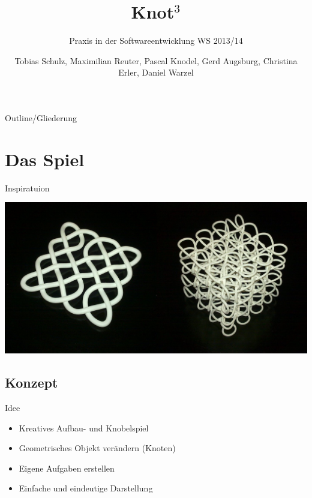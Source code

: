 \documentclass[18pt]{beamer}
\title[]{Knot$^3$ }
\subtitle{Praxis in der Softwareentwicklung WS 2013/14}
\author{Tobias Schulz, Maximilian Reuter, Pascal Knodel, Gerd Augsburg, Christina Erler, Daniel Warzel}
\institute{Institut für Betriebs- und Dialogsysteme, Lehrstuhl für Computergrafik}
\begin{document}

\begin{frame}
\titlepage
\end{frame}

\begin{frame}{Outline/Gliederung}
\tableofcontents
\end{frame}

\section{Das Spiel}
\begin{frame}{Inspiratuion}
\begin{center}
\includegraphics[scale=0.23]{Knot}
\end{center}
\end{frame}
\subsection{Konzept}
\begin{frame}{Idee}
\begin{itemize}
\item Kreatives Aufbau- und Knobelspiel
\item Geometrisches Objekt verändern (Knoten)
\item Eigene Aufgaben erstellen
\item Einfache und eindeutige Darstellung
\end{itemize}
\end{frame}
\end{document}
